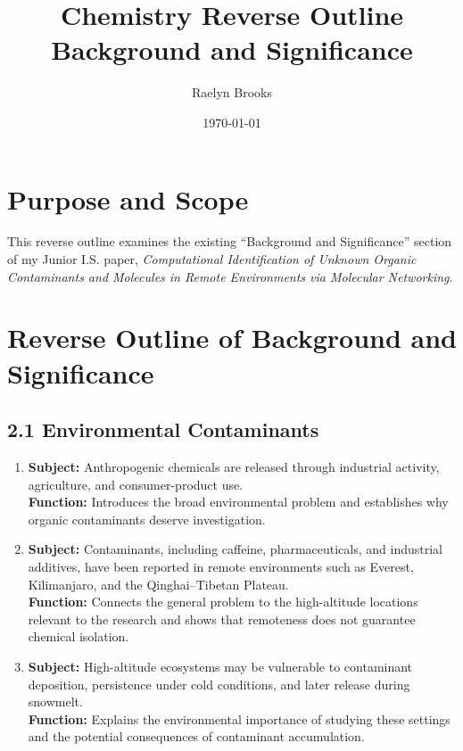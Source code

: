 \documentclass[11pt]{article}
\title{\textbf{Chemistry Reverse Outline}\\
\large Background and Significance}
\author{Raelyn Brooks}
\date{\today}
\begin{document}
\maketitle

\nocite{*}

\begin{doublespace}

\section{Purpose and Scope}
    This reverse outline examines the existing ``Background and Significance'' section of my Junior I.S. paper, \textit{Computational Identification of Unknown Organic Contaminants and Molecules in Remote Environments via Molecular Networking}.

\section{Reverse Outline of Background and Significance}

    \subsection{2.1 Environmental Contaminants}
        \begin{enumerate}[label=\textbf{Paragraph \arabic*:}, leftmargin=*]
            \item \textbf{Subject:} Anthropogenic chemicals are released through industrial activity, agriculture, and consumer-product use.\\
            \textbf{Function:} Introduces the broad environmental problem and establishes why organic contaminants deserve investigation.
            \item \textbf{Subject:} Contaminants, including caffeine, pharmaceuticals, and industrial additives, have been reported in remote environments such as Everest, Kilimanjaro, and the Qinghai--Tibetan Plateau.\\
            \textbf{Function:} Connects the general problem to the high-altitude locations relevant to the research and shows that remoteness does not guarantee chemical isolation.
            \item \textbf{Subject:} High-altitude ecosystems may be vulnerable to contaminant deposition, persistence under cold conditions, and later release during snowmelt.\\
            \textbf{Function:} Explains the environmental importance of studying these settings and the potential consequences of contaminant accumulation.
        \end{enumerate}


\end{doublespace}
\end{document}

